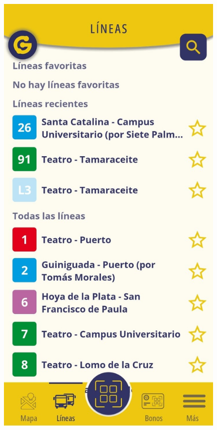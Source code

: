 \documentclass[a4paper,12pt]{article}
\begin{document}
\begin{figure}[htbp]
    \centering
    \begin{minipage}{0.5\textwidth}
        \includegraphics[width=\linewidth]{Images/seccion_lineas.jpg}
    \end{minipage}%
    \hspace{0.8cm}
    \begin{minipage}{0.3\textwidth}
        \setlength{\parskip}{20pt}  %
        

\end{minipage}
\end{figure}
\end{document}
